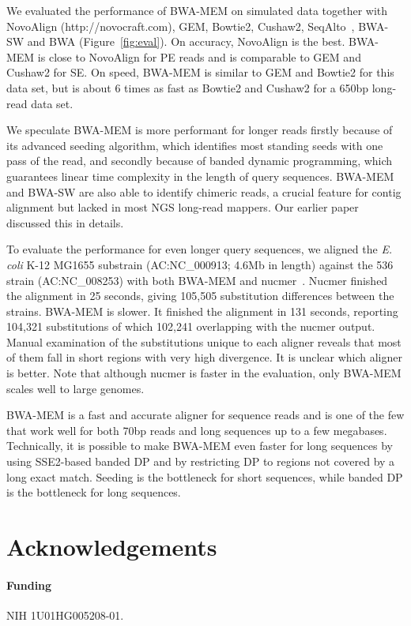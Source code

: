 \documentclass{bioinfo}
\begin{document}
We evaluated the performance of BWA-MEM on simulated data together with
NovoAlign (http://novocraft.com), GEM, Bowtie2, Cushaw2, SeqAlto~\citep{Mu:2012fk}, %
BWA-SW
and BWA (Figure~\ref{fig:eval}). On accuracy, NovoAlign is the best. BWA-MEM
is close to NovoAlign for PE reads and is comparable to GEM and Cushaw2 for SE.
On speed, BWA-MEM is similar to GEM and Bowtie2 for this data set, but is about
6 times as fast as Bowtie2 and Cushaw2 for a 650bp long-read data set.

We speculate BWA-MEM is more performant for longer reads firstly because of its
advanced seeding algorithm, which identifies most standing seeds with one pass
of the read, and secondly because of banded dynamic programming, which
guarantees linear time complexity in the length of query sequences. BWA-MEM and
BWA-SW are also able to identify chimeric reads, a crucial feature for contig
alignment but lacked in most NGS long-read mappers. Our earlier
paper~\citep{Li:2010fk} discussed this in details.

To evaluate the performance for even longer query sequences, we aligned the
{\it E. coli} K-12 MG1655 substrain (AC:NC\_000913; 4.6Mb in length) against
the 536 strain (AC:NC\_008253) with both BWA-MEM and
nucmer~\citep{Kurtz:2004zr}. Nucmer finished the alignment in 25 seconds,
giving 105,505 substitution differences between the strains. BWA-MEM is slower.
It finished the alignment in 131 seconds, reporting 104,321 substitutions of
which 102,241 overlapping with the nucmer output. Manual examination of the
substitutions unique to each aligner reveals that most of them fall in short
regions with very high divergence. It is unclear which aligner is better. Note
that although nucmer is faster in the evaluation, only BWA-MEM scales well to
large genomes.

BWA-MEM is a fast and accurate aligner for sequence reads and is one of the few
that work well for both 70bp reads and long sequences up to a few megabases.
Technically, it is possible to make BWA-MEM even faster for long sequences by
using SSE2-based banded DP and by restricting DP to regions not covered by a
long exact match. Seeding is the bottleneck for short sequences, while banded
DP is the bottleneck for long sequences.

\section{Acknowledgements}
\paragraph{Funding\textcolon} NIH 1U01HG005208-01.

\end{document}
